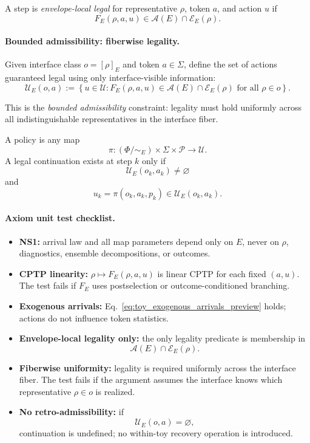 \documentclass[aps,prx,onecolumn,11pt]{revtex4-2}
\theoremstyle{plain}
\theoremstyle{definition}
\theoremstyle{remark}
\begin{document}
A step is \emph{envelope-local legal} for representative \(\rho\),
token \(a\), and action \(u\) if
\[
F_E(\rho,a,u)
\in
\mathcal A(E)\cap\mathcal E_E(\rho).
\]

\paragraph{Bounded admissibility: fiberwise legality.}

Given interface class \(o=[\rho]_E\) and token \(a\in\Sigma\), define
the set of actions guaranteed legal using only interface-visible
information:
\begin{equation}
\mathcal U_E(o,a)
:=
\left\{
u\in\mathcal U:
F_E(\rho,a,u)
\in
\mathcal A(E)\cap\mathcal E_E(\rho)
\text{ for all }\rho\in o
\right\}.
\label{eq:toy_preview_legal_actions}
\end{equation}

This is the \emph{bounded admissibility} constraint: legality must hold
uniformly across all indistinguishable representatives in the interface
fiber.

A policy is any map
\[
\pi:
(\Phi/{\sim_E})\times\Sigma\times\mathcal P
\to
\mathcal U.
\]
A legal continuation exists at step \(k\) only if
\[
\mathcal U_E(o_k,a_k)\neq\varnothing
\]
and
\[
u_k=\pi(o_k,a_k,p_k)\in\mathcal U_E(o_k,a_k).
\]

\paragraph{Axiom unit test checklist.}

\begin{itemize}

\item \textbf{NS1:} arrival law and all map parameters depend only on
\(E\), never on \(\rho\), diagnostics, ensemble decompositions, or
outcomes.

\item \textbf{CPTP linearity:} \(\rho\mapsto F_E(\rho,a,u)\) is linear
CPTP for each fixed \((a,u)\). The test fails if \(F_E\) uses
postselection or outcome-conditioned branching.

\item \textbf{Exogenous arrivals:}
Eq.~\eqref{eq:toy_exogenous_arrivals_preview} holds; actions do not
influence token statistics.

\item \textbf{Envelope-local legality only:} the only legality predicate
is membership in
\[
\mathcal A(E)\cap\mathcal E_E(\rho).
\]

\item \textbf{Fiberwise uniformity:} legality is required uniformly
across the interface fiber. The test fails if the argument assumes the
interface knows which representative \(\rho\in o\) is realized.

\item \textbf{No retro-admissibility:} if
\[
\mathcal U_E(o,a)=\varnothing,
\]
continuation is undefined; no within-toy recovery operation is
introduced.

\end{itemize}
\end{document}

